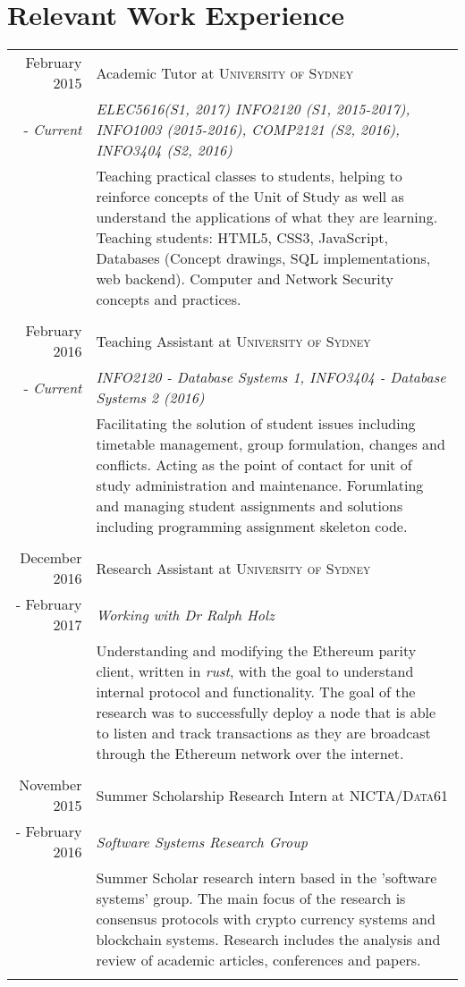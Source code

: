 \documentclass[10pt]{article}
\begin{document}
\section{Relevant Work Experience}
\begin{tabular}{r|p{11cm}}
February 2015 & Academic Tutor at \textsc{University of Sydney} \\ - \emph{Current} & \emph{ELEC5616(S1, 2017) INFO2120 (S1, 2015-2017), INFO1003 (2015-2016), COMP2121 (S2, 2016), INFO3404 (S2, 2016)}\\&\footnotesize{Teaching practical classes to students, helping to reinforce concepts of the Unit of Study as well as understand the applications of what they are learning. Teaching students: HTML5, CSS3, JavaScript, Databases (Concept drawings, SQL implementations, web backend). Computer and Network Security concepts and practices.}\\\multicolumn{2}{c}{} \\
February 2016 & Teaching Assistant at
\textsc{University of Sydney} \\ - \emph{Current}
&\emph{INFO2120 - Database Systems 1, INFO3404 -
Database Systems 2 (2016)}\\&\footnotesize{ Facilitating the solution of student issues including timetable management, group formulation, changes and conflicts. Acting as the point of contact for unit of study administration and maintenance. Forumlating and managing student assignments and solutions including programming assignment skeleton code.}\\\multicolumn{2}{c}{} \\
December 2016 & Research Assistant at \textsc{University of Sydney} \\ - February 2017 & \emph{Working with Dr Ralph Holz}\\ & \footnotesize{Understanding and modifying the Ethereum parity client, written in \emph{rust}, with the goal to understand internal protocol and functionality. The goal of the research was to successfully deploy a node that is able to listen and track transactions as they are broadcast through the Ethereum network over the internet.}\\\multicolumn{2}{c}{} \\
November 2015 & Summer Scholarship Research Intern at \textsc{NICTA/Data61} \\ - February 2016 & \emph{Software Systems Research Group}\\&\footnotesize{Summer Scholar research intern based in the 'software systems' group. The main focus of the research is consensus protocols with crypto currency systems and blockchain systems. Research includes the analysis and review of academic articles, conferences and papers. }\\\multicolumn{2}{c}{}\\

\end{tabular}
\end{document}
